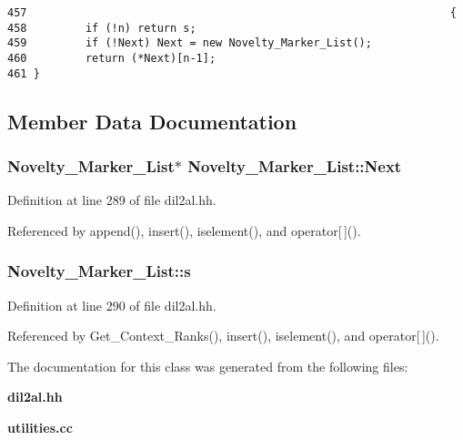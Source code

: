 \footnotesize\begin{verbatim}457                                                                 {
458         if (!n) return s;
459         if (!Next) Next = new Novelty_Marker_List();
460         return (*Next)[n-1];
461 }
\end{verbatim}\normalsize 


\subsection{Member Data Documentation}
\subsubsection{\setlength{\rightskip}{0pt plus 5cm}Novelty\_\-Marker\_\-List$\ast$ Novelty\_\-Marker\_\-List::Next\hspace{0.3cm}{\tt  [protected]}}\label{classNovelty__Marker__List_n0}




Definition at line 289 of file dil2al.hh.

Referenced by append(), insert(), iselement(), and operator[$\,$]().
\subsubsection{ Novelty\_\-Marker\_\-List::s\hspace{0.3cm}{\tt  [protected]}}\label{classNovelty__Marker__List_n1}




Definition at line 290 of file dil2al.hh.

Referenced by Get\_\-Context\_\-Ranks(), insert(), iselement(), and operator[$\,$]().

The documentation for this class was generated from the following files:\begin{CompactItemize}
\item 
{\bf dil2al.hh}\item 
{\bf utilities.cc}\end{CompactItemize}

